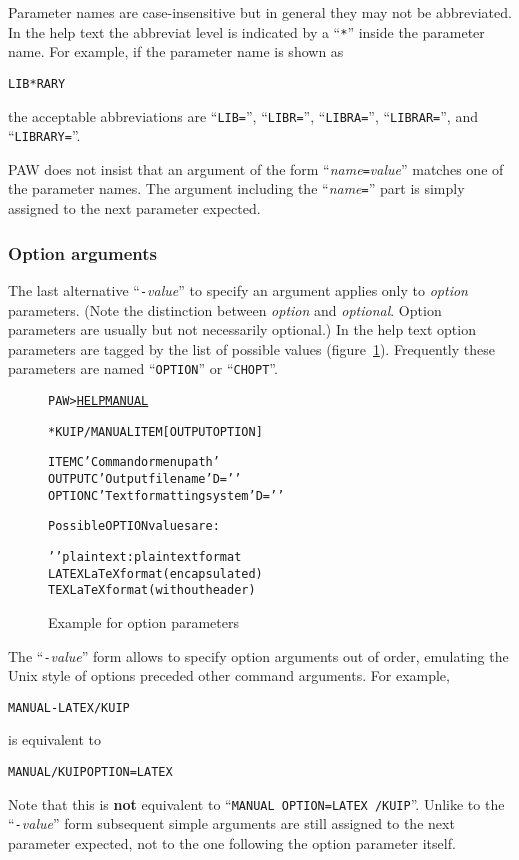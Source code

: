 Parameter names are case-insensitive but in general they may not be
abbreviated. 
In the help text the abbreviat level is indicated by a ``\texttt{*}'' inside 
the parameter name.
For example, if the parameter name is shown as
\begin{alltt}
LIB*RARY
\end{alltt}
the acceptable abbreviations are ``\texttt{LIB=}'',
``\texttt{LIBR=}'', ``\texttt{LIBRA=}'', ``\texttt{LIBRAR=}'', and
``\texttt{LIBRARY=}''.

PAW does not insist that an argument of the form
``\textsl{name\texttt{=}value}'' matches one of the parameter names. 
The argument including the ``\textsl{name\texttt{=}}'' part is simply
assigned to the next parameter expected.


\subsubsection{Option arguments}

The last alternative ``\texttt{-}\textsl{value}'' to specify an
argument applies only to \textsl{option} parameters.
(Note the distinction between \emph{option} and \emph{optional}.
Option parameters are usually but not necessarily optional.)
In the help text option parameters are tagged by the list of possible
values (figure~\ref{fig-help-manual}).
Frequently these parameters are named ``\texttt{OPTION}'' or
``\texttt{CHOPT}''. 

\begin{figure}
\begin{alltt}
PAW > \underline{HELP MANUAL}

 * KUIP/MANUAL ITEM [ OUTPUT OPTION ]

   ITEM       C 'Command or menu path'
   OUTPUT     C 'Output file name' D=' '
   OPTION     C 'Text formatting system' D=' '

   Possible OPTION values are:

   ' '     plain text : plain text format
    LATEX  LaTeX format (encapsulated)
    TEX    LaTeX format (without header)
\end{alltt}
\caption{Example for option parameters
\label{fig-help-manual}}
\end{figure}

The ``\texttt{-}\textsl{value}'' form allows to specify option
arguments out of order, emulating the Unix style of options preceded
other command arguments.
For example,
\begin{alltt}
MANUAL -LATEX /KUIP
\end{alltt}
is equivalent to 
\begin{alltt}
MANUAL /KUIP OPTION=LATEX
\end{alltt}
Note that this is \textbf{not} equivalent to 
``\texttt{MANUAL OPTION=LATEX /KUIP}''.
Unlike to the ``\texttt{-}\textsl{value}'' form subsequent simple
arguments are still assigned to the next parameter expected, not to
the one following the option parameter itself.

